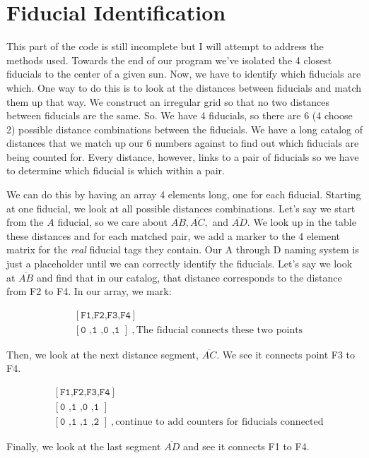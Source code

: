 \documentclass[10pt]{scrartcl}
\begin{document}
\section{Fiducial Identification} %
\label{sec:fiducial_identification}
This part of the code is still incomplete but I will attempt to address the methods used. Towards the end of our program we've isolated the 4 closest fiducials to the center of a given sun. Now, we have to identify which fiducials are which. One way to do this is to look at the distances between fiducials and match them up that way. We construct an irregular grid so that no two distances between fiducials are the same. So. We have 4 fiducials, so there are 6 (4 choose 2) possible distance combinations between the fiducials. We have a long catalog of distances that we match up our 6 numbers against to find out which fiducials are being counted for. Every distance, however, links to a pair of fiducials so we have to determine which fiducial is which within a pair. 

We can do this by having an array 4 elements long, one for each fiducial. Starting at one fiducial, we look at all possible distances combinations. Let's say we start from the $A$ fiducial, so we care about $\overline{AB},\overline{AC},$ and $\overline{AD}$. We look up in the table these distances and for each matched pair, we add a marker to the 4 element matrix for the \emph{real} fiducial tags they contain. Our A through D naming system is just a placeholder until we can correctly identify the fiducials. Let's say we look at $\overline{AB}$ and find that in our catalog, that distance corresponds to the distance from F2 to F4. In our array, we mark:

\begin{align}
  &[\texttt{F1,F2,F3,F4}]\\
  &[\texttt{0 ,1 ,0 ,1 }]~,\textrm{The fiducial connects these two points}
\end{align}

Then, we look at the next distance segment, $\overline{AC}$. We see it connects point F3 to F4.

\begin{align}
  &[\texttt{F1,F2,F3,F4}]\\
  &[\texttt{0 ,1 ,0 ,1 }]\\
  &[\texttt{0 ,1 ,1 ,2 }]~,\textrm{continue to add counters for fiducials connected}
\end{align}

Finally, we look at the last segment $\overline{AD}$ and see it connects F1 to F4.
\end{document}
